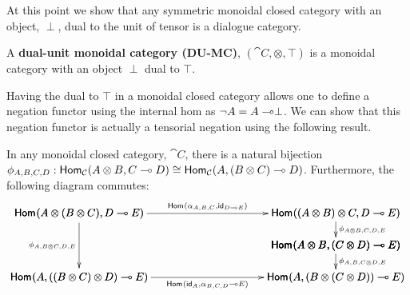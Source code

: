 At this point we show that any symmetric monoidal closed category with
an object, $\perp$, dual to the unit of tensor is a dialogue category.
\begin{definition}
  \label{def:double-unit-monoidal-category}
  A \textbf{dual-unit monoidal category (DU-MC)}, $(\cat{C}, \otimes, \top)$
  is a monoidal category with an object $\perp$ dual to $\top$.
\end{definition}
Having the dual to $\top$ in a monoidal closed category allows one to
define a negation functor using the internal hom as $\lnot A = A \multimap
\perp$.  We can show that this negation functor is actually a
tensorial negation using the following result.
\begin{lemma}
  \label{lemma:monoidal-fact1}
  In any monoidal closed category, $\cat{C}$, there is a natural bijection
  $\phi_{A,B,C,D} : \mathsf{Hom}_{\mathcal{C}}(A \otimes B,C \multimap D) \cong \mathsf{Hom}_{\mathcal{C}}(A,(B \otimes C) \multimap D)$.
  Furthermore, the following diagram commutes:
  \[
  \bfig
  \morphism(0,85)|l|/<-/<0,480>[`;\phi_{A,B \otimes C,D,E}]
  \vSquares/->``->```->`->/<300,300>%
              [\homs{}{A \otimes (B \otimes C)}{D \limp E}`%
                \homs{}{(A \otimes B) \otimes C}{D \limp E}``%
                \homs{}{A \otimes B}{(C \otimes D) \limp E}`%
                \homs{}{A}{((B \otimes C) \otimes D) \limp E}`%
                \homs{}{A}{(B \otimes (C \otimes D)) \limp E};%
                \homs{}{\alpha_{A,B,C}}{\id_{D \limp E}}``%
                \phi_{A \otimes B,C,D,E}```%
                \phi_{A,B,C \otimes D,E}`%
                \homs{}{\id_{A}}{\alpha_{B,C,D} \limp E}]
  \efig
  \]
\end{lemma}
